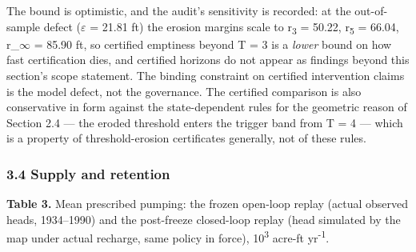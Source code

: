 \documentclass[11pt]{article}
\begin{document}
The bound is optimistic, and the audit's sensitivity is recorded: at the
out-of-sample defect (\ensuremath{\varepsilon} = 21.81 ft) the erosion margins scale to r\textsubscript{3} =
50.22, r\textsubscript{5} = 66.04, r\_\ensuremath{\infty} = 85.90 ft, so certified emptiness beyond T = 3
is a \emph{lower} bound on how fast certification dies, and certified
horizons do not appear as findings beyond this section's scope
statement. The binding constraint on certified intervention claims is
the model defect, not the governance. The certified comparison is also
conservative in form against the state-dependent rules for the geometric
reason of Section 2.4 --- the eroded threshold enters the trigger band
from T = 4 --- which is a property of threshold-erosion certificates
generally, not of these rules.

\subsubsection{3.4 Supply and retention}\label{supply-and-retention}

\textbf{Table 3.} Mean prescribed pumping: the frozen open-loop replay
(actual observed heads, 1934--1990) and the post-freeze closed-loop
replay (head simulated by the map under actual recharge, same policy in
force), 10\textsuperscript{3} acre-ft yr\textsuperscript{-1}.
\end{document}
